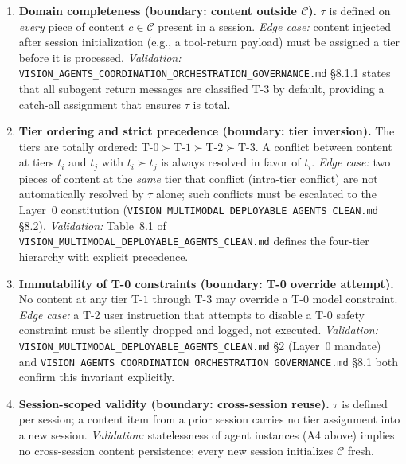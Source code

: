 \documentclass[12pt]{article}
\theoremstyle{definition}
\newcommand{\code}[1]{\texttt{#1}}
\newcommand{\VisionClean}{\code{VISION\_MULTIMODAL\_\allowbreak DEPLOYABLE\_\allowbreak AGENTS\_CLEAN.md}}
\newcommand{\VisionGov}{\code{VISION\_AGENTS\_\allowbreak COORDINATION\_\allowbreak ORCHESTRATION\_\allowbreak GOVERNANCE.md}}
\begin{document}
\begin{enumerate}[label=\textbf{T\arabic*.}, leftmargin=*, widest=T9]

  \item \textbf{Domain completeness (boundary: content outside
        $\mathcal{C}$).}
        $\tau$ is defined on \emph{every} piece of content
        $c \in \mathcal{C}$ present in a session.
        \emph{Edge case:} content injected after session initialization
        (e.g., a tool-return payload) must be assigned a tier before
        it is processed.
        \emph{Validation:} \VisionGov{} \S8.1.1 states that all
        subagent return messages are classified T-3 by default,
        providing a catch-all assignment that ensures $\tau$ is total.

  \item \textbf{Tier ordering and strict precedence (boundary:
        tier inversion).}
        The tiers are totally ordered:
        $\mathrm{T\text{-}0} \succ \mathrm{T\text{-}1}
         \succ \mathrm{T\text{-}2} \succ \mathrm{T\text{-}3}$.
        A conflict between content at tiers $t_i$ and $t_j$ with
        $t_i \succ t_j$ is always resolved in favor of $t_i$.
        \emph{Edge case:} two pieces of content at the \emph{same}
        tier that conflict (intra-tier conflict) are not automatically
        resolved by $\tau$ alone; such conflicts must be escalated to
        the Layer~0 constitution (\VisionClean{} \S8.2).
        \emph{Validation:} Table~8.1 of \VisionClean{} defines the
        four-tier hierarchy with explicit precedence.

  \item \textbf{Immutability of T-0 constraints (boundary: T-0
        override attempt).}
        No content at any tier $\mathrm{T\text{-}1}$ through
        $\mathrm{T\text{-}3}$ may override a T-0 model constraint.
        \emph{Edge case:} a T-2 user instruction that attempts to
        disable a T-0 safety constraint must be silently dropped and
        logged, not executed.
        \emph{Validation:} \VisionClean{} \S2 (Layer~0 mandate) and
        \VisionGov{} \S8.1 both confirm this invariant explicitly.

  \item \textbf{Session-scoped validity (boundary: cross-session
        reuse).}
        $\tau$ is defined per session; a content item from a prior
        session carries no tier assignment into a new session.
        \emph{Validation:} statelessness of agent instances
        (A4 above) implies no cross-session content persistence;
        every new session initializes $\mathcal{C}$ fresh.


\end{enumerate}
\end{document}

